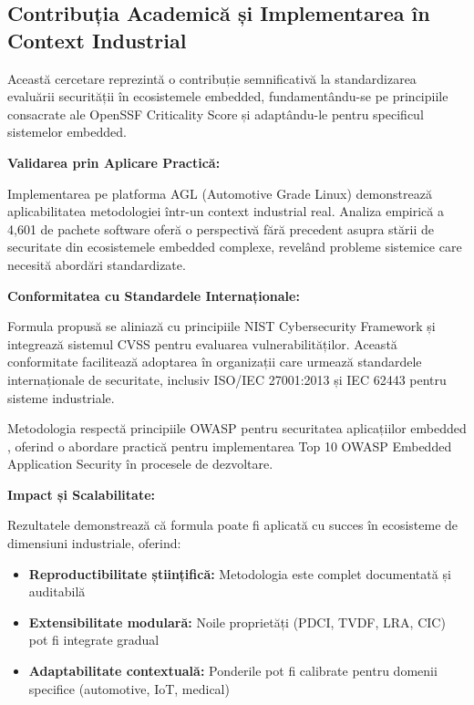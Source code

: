 \documentclass[12pt,a4paper]{article}
\begin{document}
\subsection{Contribuția Academică și Implementarea în Context Industrial}

Această cercetare reprezintă o contribuție semnificativă la standardizarea evaluării securității în ecosistemele embedded, fundamentându-se pe principiile consacrate ale OpenSSF Criticality Score \cite{openssf2021criticality_web,pike_github} și adaptându-le pentru specificul sistemelor embedded.

\textbf{Validarea prin Aplicare Practică:}

Implementarea pe platforma AGL (Automotive Grade Linux) \cite{agl_website,agl2021platform} demonstrează aplicabilitatea metodologiei într-un context industrial real. Analiza empirică a 4,601 de pachete software oferă o perspectivă fără precedent asupra stării de securitate din ecosistemele embedded complexe, revelând probleme sistemice care necesită abordări standardizate.

\textbf{Conformitatea cu Standardele Internaționale:}

Formula propusă se aliniază cu principiile NIST Cybersecurity Framework \cite{nist_framework_web,nist2018framework} și integrează sistemul CVSS \cite{cvss_scoring} pentru evaluarea vulnerabilităților. Această conformitate facilitează adoptarea în organizații care urmează standardele internaționale de securitate, inclusiv ISO/IEC 27001:2013 \cite{iso27001} și IEC 62443 \cite{iec62443} pentru sisteme industriale.

Metodologia respectă principiile OWASP pentru securitatea aplicațiilor embedded \cite{owasp_embedded_top10}, oferind o abordare practică pentru implementarea Top 10 OWASP Embedded Application Security în procesele de dezvoltare.

\textbf{Impact și Scalabilitate:}

Rezultatele demonstrează că formula poate fi aplicată cu succes în ecosisteme de dimensiuni industriale, oferind:

\begin{itemize}
\item \textbf{Reproductibilitate științifică:} Metodologia este complet documentată și auditabilă
\item \textbf{Extensibilitate modulară:} Noile proprietăți (PDCI, TVDF, LRA, CIC) pot fi integrate gradual
\item \textbf{Adaptabilitate contextuală:} Ponderile pot fi calibrate pentru domenii specifice (automotive, IoT, medical)
\end{itemize}
\end{document}
